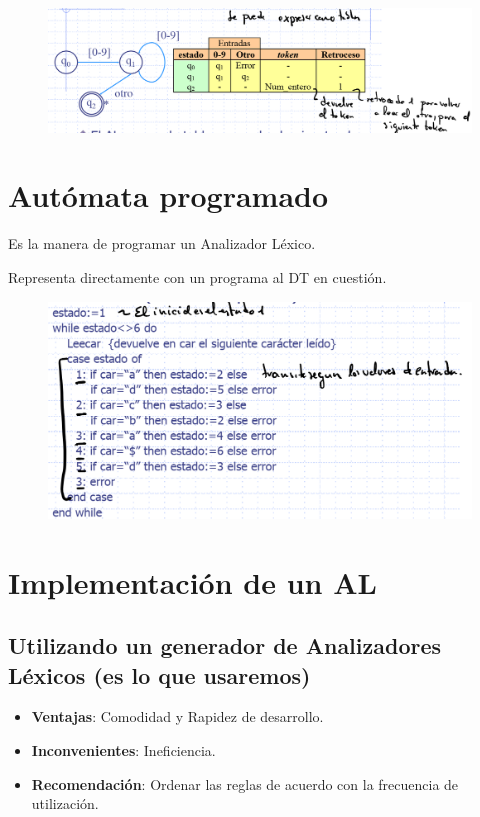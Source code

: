\documentclass[12pt, twoside, openright]{report} %
\begin{document}
\begin{figure}[H]
	{\includegraphics[scale=.25]{Untitled 31.png}}
\end{figure}

\section{Autómata programado}

Es la manera de programar un Analizador Léxico.

Representa directamente con un programa al DT en cuestión.

\begin{figure}[H]
	{\includegraphics[scale=.3]{Untitled 32.png}}
\end{figure}

\section{Implementación de un AL}

\subsection{Utilizando un generador de Analizadores Léxicos (es lo que usaremos)}

\begin{itemize}
\item
  \textbf{Ventajas}: Comodidad y Rapidez de desarrollo.
\item
  \textbf{Inconvenientes}: Ineficiencia.
\item
  \textbf{Recomendación}: Ordenar las reglas de acuerdo con la frecuencia
  de utilización.
\end{itemize}
\end{document}

